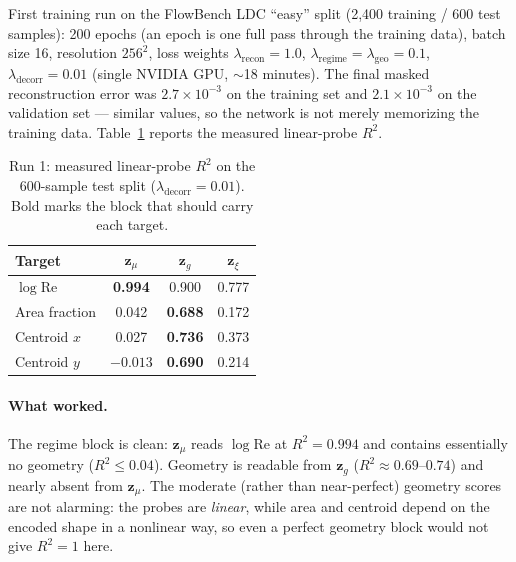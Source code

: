 \documentclass[11pt]{article}
\begin{document}
First training run on the FlowBench LDC ``easy'' split (2{,}400 training
/ 600 test samples): 200 epochs (an epoch is one full pass through the
training data), batch size 16, resolution $256^2$, loss weights
$\lambda_{\mathrm{recon}} = 1.0$, $\lambda_{\mathrm{regime}} =
\lambda_{\mathrm{geo}} = 0.1$, $\lambda_{\mathrm{decorr}} = 0.01$
(single NVIDIA GPU, $\sim$18 minutes). The final masked reconstruction
error was $2.7 \times 10^{-3}$ on the training set and $2.1 \times
10^{-3}$ on the validation set --- similar values, so the network is not
merely memorizing the training data. Table~\ref{tab:probes-run1} reports
the measured linear-probe $R^2$.

\begin{table}[htbp]
  \centering
  \caption{Run 1: measured linear-probe $R^2$ on the 600-sample test split
  ($\lambda_{\mathrm{decorr}} = 0.01$). Bold marks the block that should
  carry each target.}
  \label{tab:probes-run1}
  \begin{tabular}{lccc}
    \toprule
    Target & $\boldsymbol{z}_{\mu}$ & $\boldsymbol{z}_{g}$ & $\boldsymbol{z}_{\xi}$ \\
    \midrule
    $\log \mathrm{Re}$    & \textbf{0.994} & 0.900          & 0.777 \\
    Area fraction         & 0.042          & \textbf{0.688} & 0.172 \\
    Centroid $x$          & 0.027          & \textbf{0.736} & 0.373 \\
    Centroid $y$          & $-0.013$       & \textbf{0.690} & 0.214 \\
    \bottomrule
  \end{tabular}
\end{table}

\paragraph{What worked.} The regime block is clean:
$\boldsymbol{z}_{\mu}$ reads $\log \mathrm{Re}$ at $R^2 = 0.994$ and
contains essentially no geometry ($R^2 \le 0.04$). Geometry is readable
from $\boldsymbol{z}_{g}$ ($R^2 \approx 0.69$--$0.74$) and nearly absent
from $\boldsymbol{z}_{\mu}$. The moderate (rather than near-perfect)
geometry scores are not alarming: the probes are \emph{linear}, while
area and centroid depend on the encoded shape in a nonlinear way, so even
a perfect geometry block would not give $R^2 = 1$ here.
\end{document}
